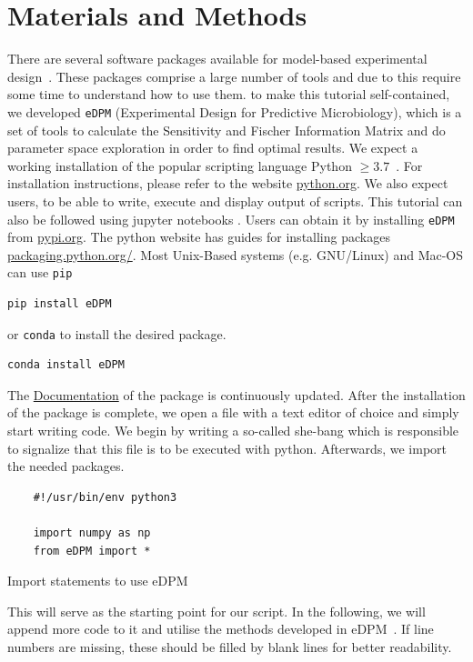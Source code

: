 \documentclass[10pt,A4paper]{article}
\begin{document}
\section*{Materials and Methods}
There are several software packages available for model-based experimental design~\cite{balsa-canto_amigo2_2016, zhang_optimal_2018, busetto_near-optimal_2013}.
These packages comprise a large number of tools and due to this require some time to understand how to use them. to make this tutorial self-contained, we developed \texttt{eDPM} (Experimental Design for Predictive Microbiology), which is a set of tools to calculate the Sensitivity and Fischer Information Matrix and do parameter space exploration in order to find optimal results.
We expect a working installation of the popular scripting language Python $\geq3.7$~\cite{rossumPythonLanguageReference2010}.
For installation instructions, please refer to the website \href{https://www.python.org/downloads/}{python.org}.
We also expect users, to be able to write, execute and display output of scripts.
This tutorial can also be followed using jupyter notebooks \cite{jupyterteamJupyterNotebook}.
Users can obtain it by installing \texttt{eDPM} from \href{https://pypi.org/project/FisInMa/0.0.1/}{pypi.org}.
The python website has guides for installing packages \href{https://packaging.python.org/en/latest/tutorials/installing-packages/}{packaging.python.org/}.
Most Unix-Based systems (e.g. GNU/Linux) and Mac-OS can use \texttt{pip}
\begin{verbatim}
pip install eDPM
\end{verbatim}
or \texttt{conda} to install the desired package.
\begin{verbatim}
conda install eDPM
\end{verbatim}
The \href{https://spatial-systems-biology-freiburg.github.io/Fishi/}{Documentation} of the package is continuously updated.
After the installation of the package is complete, we open a file with a text editor of choice and simply start writing code.
We begin by writing a so-called she-bang which is responsible to signalize that this file is to be executed with python.
Afterwards, we import the needed packages.
\begin{code}[h]
    \begin{verbatim}
    #!/usr/bin/env python3

    import numpy as np
    from eDPM import *
    \end{verbatim}
    \caption{Import statements to use eDPM}
    \label{code:import_statements}
\end{code}
This will serve as the starting point for our script.
In the following, we will append more code to it and utilise the methods developed in eDPM~\cite{edpm2023}.
If line numbers are missing, these should be filled by blank lines for better readability.
%
%
\end{document}
